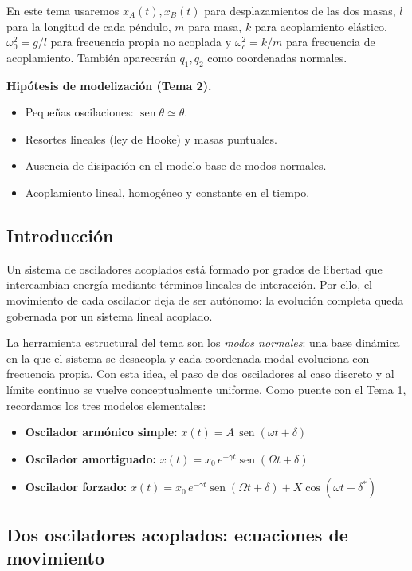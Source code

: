 \documentclass[12pt, a4paper]{article}
\theoremstyle{plain}
\theoremstyle{definition}
\theoremstyle{remark}
\DeclareMathOperator{\sen}{sen}
\begin{document}
En este tema usaremos $x_A(t),x_B(t)$ para desplazamientos de las dos masas, $l$ para la
longitud de cada péndulo, $m$ para masa, $k$ para acoplamiento elástico,
$\omega_0^2=g/l$ para frecuencia propia no acoplada y $\omega_c^2=k/m$ para frecuencia de
acoplamiento. También aparecerán $q_1,q_2$ como coordenadas normales.

\begin{mdframed}[style=resultado]
\textbf{Hipótesis de modelización (Tema 2).}
\begin{itemize}
  \item Pequeñas oscilaciones: $\sen\theta\simeq\theta$.
  \item Resortes lineales (ley de Hooke) y masas puntuales.
  \item Ausencia de disipación en el modelo base de modos normales.
  \item Acoplamiento lineal, homogéneo y constante en el tiempo.
\end{itemize}
\end{mdframed}

\subsection{Introducción}

Un sistema de osciladores acoplados está formado por grados de libertad que intercambian
energía mediante términos lineales de interacción. Por ello, el movimiento de cada
oscilador deja de ser autónomo: la evolución completa queda gobernada por un sistema
lineal acoplado.

La herramienta estructural del tema son los \emph{modos normales}: una base dinámica en la
que el sistema se desacopla y cada coordenada modal evoluciona con frecuencia propia.
Con esta idea, el paso de dos osciladores al caso discreto y al límite continuo se vuelve
conceptualmente uniforme. Como puente con el Tema 1, recordamos los tres modelos elementales:
\begin{itemize}
  \item \textbf{Oscilador armónico simple:}
        $x(t) = A\,\sen(\omega t + \delta)$
  \item \textbf{Oscilador amortiguado:}
        $x(t) = x_0\,e^{-\gamma t}\sen(\Omega t + \delta)$
  \item \textbf{Oscilador forzado:}
        $x(t) = x_0\,e^{-\gamma t}\sen(\Omega t + \delta) + X\cos(\omega t + \delta^*)$
\end{itemize}

\subsection{Dos osciladores acoplados: ecuaciones de movimiento}
\end{document}

